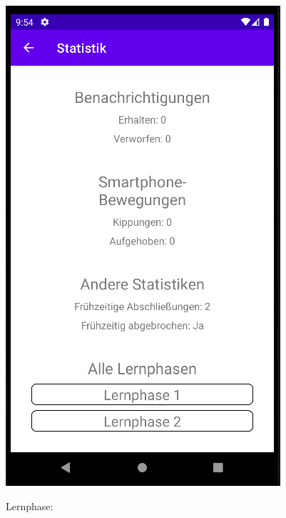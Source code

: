 \documentclass{article}
\begin{document}
\begin{center}
    \includegraphics[scale=0.45]{stats_session_2.png}
\end{center}
\newpage
\centering Lernphase:
\end{document}
